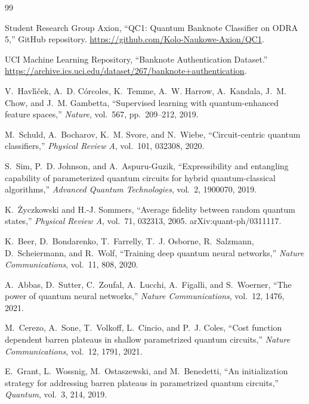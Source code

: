 \documentclass[11pt]{article}
\begin{document}
\begin{thebibliography}{99}

Student Research Group Axion,
\newblock ``QC1: Quantum Banknote Classifier on ODRA 5,''
\newblock GitHub repository.
\newblock \url{https://github.com/Kolo-Naukowe-Axion/QC1}.

UCI Machine Learning Repository,
\newblock ``Banknote Authentication Dataset.''
\newblock \url{https://archive.ics.uci.edu/dataset/267/banknote+authentication}.

V.~Havl\'{\i}\v{c}ek, A.~D. C\'orcoles, K.~Temme, A.~W. Harrow, A.~Kandala, J.~M. Chow, and J.~M. Gambetta,
\newblock ``Supervised learning with quantum-enhanced feature spaces,''
\newblock \emph{Nature}, vol.~567, pp.~209--212, 2019.

M.~Schuld, A.~Bocharov, K.~M. Svore, and N.~Wiebe,
\newblock ``Circuit-centric quantum classifiers,''
\newblock \emph{Physical Review A}, vol.~101, 032308, 2020.

S.~Sim, P.~D. Johnson, and A.~Aspuru-Guzik,
\newblock ``Expressibility and entangling capability of parameterized quantum circuits for hybrid quantum-classical algorithms,''
\newblock \emph{Advanced Quantum Technologies}, vol.~2, 1900070, 2019.

K.~\.Zyczkowski and H.-J. Sommers,
\newblock ``Average fidelity between random quantum states,''
\newblock \emph{Physical Review A}, vol.~71, 032313, 2005.
\newblock arXiv:quant-ph/0311117.

K.~Beer, D.~Bondarenko, T.~Farrelly, T.~J. Osborne, R.~Salzmann, D.~Scheiermann, and R.~Wolf,
\newblock ``Training deep quantum neural networks,''
\newblock \emph{Nature Communications}, vol.~11, 808, 2020.

A.~Abbas, D.~Sutter, C.~Zoufal, A.~Lucchi, A.~Figalli, and S.~Woerner,
\newblock ``The power of quantum neural networks,''
\newblock \emph{Nature Communications}, vol.~12, 1476, 2021.

M.~Cerezo, A.~Sone, T.~Volkoff, L.~Cincio, and P.~J. Coles,
\newblock ``Cost function dependent barren plateaus in shallow parametrized quantum circuits,''
\newblock \emph{Nature Communications}, vol.~12, 1791, 2021.

E.~Grant, L.~Wossnig, M.~Ostaszewski, and M.~Benedetti,
\newblock ``An initialization strategy for addressing barren plateaus in parametrized quantum circuits,''
\newblock \emph{Quantum}, vol.~3, 214, 2019.


\end{thebibliography}
\end{document}
